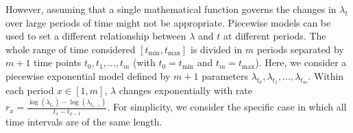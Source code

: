 \documentclass[a4paper]{article}
\begin{document}
However, assuming that a single mathematical function governs the changes in $\lambda_t$ over large periods of time might not be appropriate. Piecewise models can be used to set a different relationship between $\lambda$ and $t$ at different periods. The whole range of time considered $\left[t_{\min}, t_{\max}\right]$ is divided in $m$ periods separated by $m + 1$  time points $t_0, t_1, \dots, t_{m}$ (with $t_0 = t_{\mathrm{min}}$ and $t_{m} = t_{\mathrm{max}}$). Here, we consider a piecewise exponential model defined by $m + 1$ parameters $\lambda_{t_0},\lambda_{t_1},\dots ,\lambda_{t_{m}}$. Within each period $x\in\left[1,m\right]$, $\lambda$ changes exponentially with rate $r_x=\frac{\log\left(\lambda_{t_x}\right)-\log\left(\lambda_{t_{x-1}}\right)}{t_x-t_{x-1}}$. For simplicity, we consider the specific case in which all time intervals are of the same length.
\\


\end{document}
